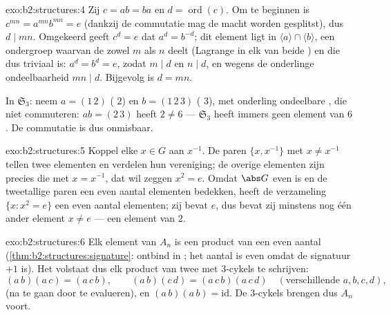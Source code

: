 \begin{solution}{exo:b2:structures:4}
Zij $c = ab = ba$ en $d = \operatorname{ord}(c)$. Om te beginnen is
$c^{mn} = a^{mn} b^{mn} = e$ (dankzij de commutatie mag de macht
worden gesplitst), dus $d \mid mn$. Omgekeerd geeft $c^d = e$ dat
$a^d = b^{-d}$; dit element ligt in $\langle a\rangle \cap \langle
b\rangle$, een ondergroep waarvan de  zowel $m$ als $n$ deelt
(Lagrange in elk van beide ) en die dus triviaal
is: $a^d = b^d = e$, zodat $m \mid d$ en $n \mid d$, en wegens de
onderlinge ondeelbaarheid $mn \mid d$. Bijgevolg is $d = mn$.

In $\mathfrak{S}_3$: neem $a = (1\,2)$ ( $2$) en $b =
(1\,2\,3)$ ( $3$), met onderling ondeelbare , die niet
commuteren: $ab = (2\,3)$ heeft  $2 \neq 6$ ---
$\mathfrak{S}_3$ heeft immers geen element van  $6$. De
commutatie is dus onmisbaar.
\end{solution}

\begin{solution}{exo:b2:structures:5}
Koppel elke $x \in G$ aan $x^{-1}$. De paren $\{x, x^{-1}\}$ met
$x \neq x^{-1}$ tellen twee elementen en verdelen hun vereniging;
de overige elementen zijn precies die met $x = x^{-1}$, dat wil
zeggen $x^2 = e$. Omdat $\abs G$ even is en de tweetallige paren
een even aantal elementen bedekken, heeft de verzameling $\{x : x^2
= e\}$ een even aantal elementen; zij bevat $e$, dus bevat zij
minstens nog één ander element $x \neq e$ --- een element van 
$2$.
\end{solution}

\begin{solution}{exo:b2:structures:6}
Elk element van $A_n$ is een product van een even aantal
 (\cref{thm:b2:structures:signature}: ontbind in
; het aantal is even omdat de signatuur $+1$ is). Het
volstaat dus elk product van twee  met $3$-cykels te
schrijven:
\[
(a\,b)(a\,c) = (a\,c\,b),
\qquad
(a\,b)(c\,d) = (a\,c\,b)(a\,c\,d) \quad (\text{verschillende }
a,b,c,d),
\]
(na te gaan door te evalueren), en $(a\,b)(a\,b) = \mathrm{id}$.
De $3$-cykels brengen dus $A_n$ voort.
\end{solution}

